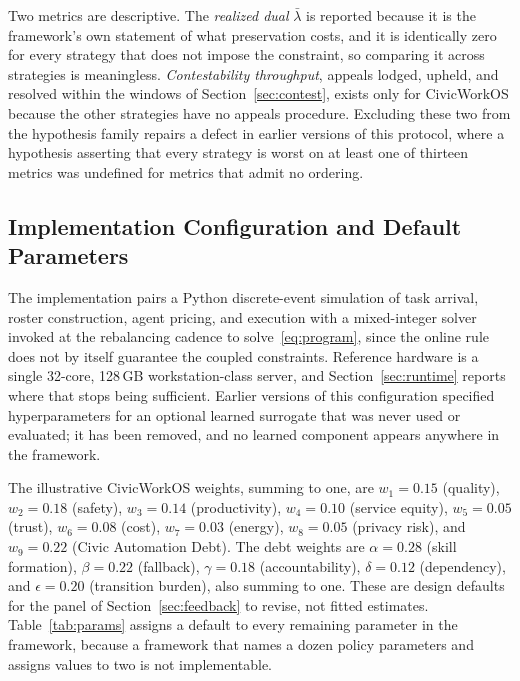 	Two metrics are descriptive. The \textit{realized dual} $\bar\lambda$ is reported because it is the framework's own statement of what preservation costs, and it is identically zero for every strategy that does not impose the constraint, so comparing it across strategies is meaningless. \textit{Contestability throughput}, appeals lodged, upheld, and resolved within the windows of Section~\ref{sec:contest}, exists only for CivicWorkOS because the other strategies have no appeals procedure. Excluding these two from the hypothesis family repairs a defect in earlier versions of this protocol, where a hypothesis asserting that every strategy is worst on at least one of thirteen metrics was undefined for metrics that admit no ordering.
	
	\subsection{Implementation Configuration and Default Parameters}
	\label{sec:config}
	
	The implementation pairs a Python discrete-event simulation of task arrival, roster construction, agent pricing, and execution with a mixed-integer solver invoked at the rebalancing cadence to solve~\eqref{eq:program}, since the online rule does not by itself guarantee the coupled constraints. Reference hardware is a single 32-core, 128\,GB workstation-class server, and Section~\ref{sec:runtime} reports where that stops being sufficient. Earlier versions of this configuration specified hyperparameters for an optional learned surrogate that was never used or evaluated; it has been removed, and no learned component appears anywhere in the framework.
	
	The illustrative CivicWorkOS weights, summing to one, are $w_1{=}0.15$ (quality), $w_2{=}0.18$ (safety), $w_3{=}0.14$ (productivity), $w_4{=}0.10$ (service equity), $w_5{=}0.05$ (trust), $w_6{=}0.08$ (cost), $w_7{=}0.03$ (energy), $w_8{=}0.05$ (privacy risk), and $w_9{=}0.22$ (Civic Automation Debt). The debt weights are $\alpha{=}0.28$ (skill formation), $\beta{=}0.22$ (fallback), $\gamma{=}0.18$ (accountability), $\delta{=}0.12$ (dependency), and $\epsilon{=}0.20$ (transition burden), also summing to one. These are design defaults for the panel of Section~\ref{sec:feedback} to revise, not fitted estimates. Table~\ref{tab:params} assigns a default to every remaining parameter in the framework, because a framework that names a dozen policy parameters and assigns values to two is not implementable.
	
